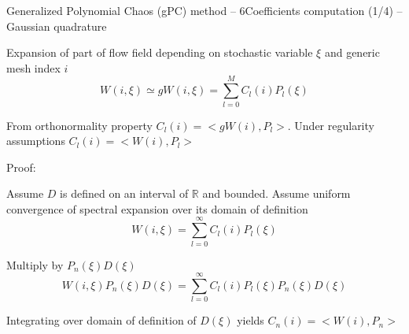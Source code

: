\documentclass[10pt]{beamer}
\def\vf{\vspace{4mm}}
\def\begit{\begin{itemize}}
\def\endit{\end{itemize}}
\newcommand{\Rset}{{\mathbb R}}
\begin{document}

\begin{frame}{Generalized Polynomial Chaos (gPC) method -- 6}{Coefficients computation (1/4) -- Gaussian quadrature}

\begit
%
\footnotesize{
\item Expansion of part of flow field  depending on stochastic variable $\xi$ and generic mesh index $i$
%
    $$ W(i,\xi) \simeq gW(i,\xi) = \sum_{l=0}^{M} C_l(i) P_l(\xi)$$
%
\item From orthonormality property $ C_l(i) =  <gW(i),P_l>$.  Under regularity assumptions $ C_l(i) =  <W(i),P_l>$  
}
\vf
\item  Proof: 
\scriptsize{ Assume $D$ is defined on an interval of $\Rset$ and bounded. Assume  uniform convergence of spectral expansion over its domain of definition 
    $$ W(i,\xi) = \sum_{l=0}^{\infty} C_l(i) P_l(\xi)$$
%
\item[] Multiply by  $P_n(\xi) D(\xi)$
     $$ W(i,\xi)P_n(\xi) D(\xi)  = \sum_{l=0}^{\infty} C_l(i) P_l(\xi) P_n(\xi) D(\xi) $$
%
\item[] Integrating over domain of definition of $D(\xi)$ yields
     $ C_n(i) =  <W(i),P_n> $ 
%
}
\endit

\end{frame} 
%
\end{document}
